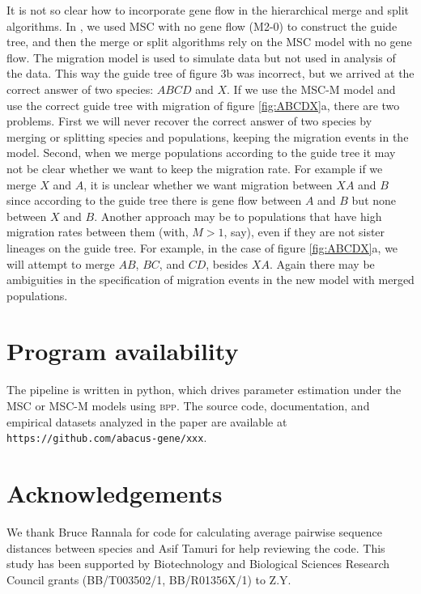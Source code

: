 \documentclass[A4]{article1}
\begin{document}
It is not so clear how to incorporate gene flow in the hierarchical merge and split
algorithms.  In \citet{Leache2019}, we used MSC with no gene flow (M2-0) to construct
the guide tree, and then the merge or split algorithms rely on the MSC model with no
gene flow.  The migration model is used to simulate data but not used in analysis of the
data. This way the guide tree of figure 3b \citep{Leache2019} was incorrect, but we
arrived at the correct answer of two species: $ABCD$ and $X$.  If we use the MSC-M model
and use the correct guide tree with migration of figure \ref{fig:ABCDX}a, there are two
problems. First we will never recover the correct answer of two species by merging or
splitting species and populations, keeping the migration events in the model. Second,
when we merge populations according to the guide tree it may not be clear whether we
want to keep the migration rate.  For example if we merge $X$ and $A$, it is unclear
whether we want migration between $XA$ and $B$ since according to the guide tree there
is gene flow between $A$ and $B$ but none between $X$ and $B$.  Another approach may be
to populations that have high migration rates between them (with, $M > 1$, say), even if
they are not sister lineages on the guide tree.  For example, in the case of figure
\ref{fig:ABCDX}a, we will attempt to merge $AB$, $BC$, and $CD$, besides $XA$.  Again
there may be ambiguities in the specification of migration events in the new model with
merged populations.


\section{Program availability}

The pipeline is written in python, which drives parameter estimation under the MSC or
MSC-M models using \textsc{bpp}.  The source code, documentation, and empirical datasets
analyzed in the paper are available at \texttt{\small https://github.com/abacus-gene/xxx}.

\section{Acknowledgements} 

We thank Bruce Rannala for code for calculating average pairwise sequence distances
between species and Asif Tamuri for help reviewing the code.  This study has been
supported by Biotechnology and Biological Sciences Research Council grants (BB/T003502/1,
BB/R01356X/1) to Z.Y.
\end{document}
